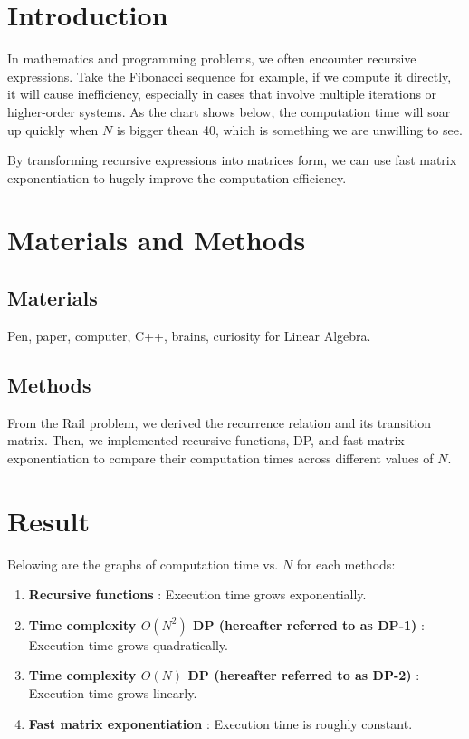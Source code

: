 \section{Introduction}

In mathematics and programming problems, we often encounter recursive expressions.
Take the Fibonacci sequence for example, if we compute it directly, it will cause inefficiency, especially in cases that involve multiple iterations or higher-order systems.
As the chart shows below, the computation time will soar up quickly when $N$ is bigger thean 40, which is something we are unwilling to see.

By transforming recursive expressions into matrices form, we can use fast matrix exponentiation to hugely improve the computation efficiency.

\section{Materials and Methods}
\subsection{Materials}

Pen, paper, computer, C++, brains, curiosity for Linear Algebra.

\subsection{Methods}

From the Rail problem, we derived the recurrence relation and its transition matrix.
Then, we implemented recursive functions, DP, and fast matrix exponentiation to compare their computation times across different values of $N$.

\section{Result}

Belowing are the graphs of computation time vs. $N$ for each methods:
\begin{enumerate}
    \item \textbf{Recursive functions} : Execution time grows exponentially.
    \item \textbf{Time complexity $O(N^2)$ DP (hereafter referred to as DP-1)} : Execution time grows quadratically.
    \item \textbf{Time complexity $O(N)$ DP (hereafter referred to as DP-2)} : Execution time grows linearly.
    \item \textbf{Fast matrix exponentiation} : Execution time is roughly constant.
\end{enumerate}

